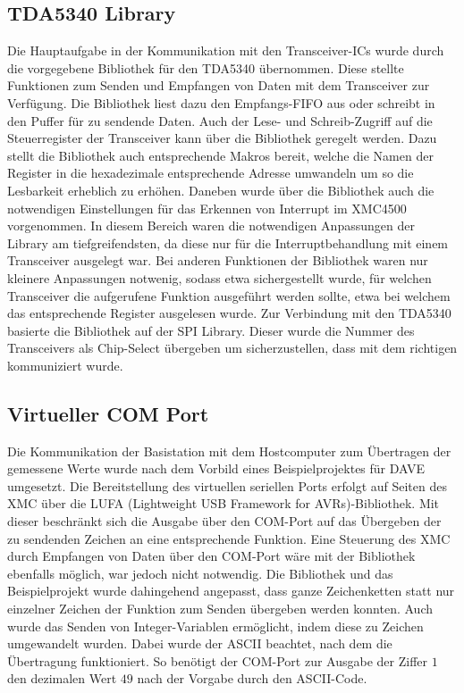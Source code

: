 \subsection{TDA5340 Library}
Die Hauptaufgabe in der Kommunikation mit den Transceiver-\acp{IC} wurde durch die vorgegebene Bibliothek für den TDA5340 übernommen. Diese stellte Funktionen zum Senden und Empfangen von Daten mit dem Transceiver zur Verfügung. Die Bibliothek liest dazu den Empfangs-\ac{FIFO} aus oder schreibt in den Puffer für zu sendende Daten. Auch der Lese- und Schreib-Zugriff auf die Steuerregister der Transceiver kann über die Bibliothek geregelt werden. Dazu stellt die Bibliothek auch entsprechende Makros bereit, welche die Namen der Register in die hexadezimale entsprechende Adresse umwandeln um so die Lesbarkeit erheblich zu erhöhen. Daneben wurde über die Bibliothek auch die notwendigen  Einstellungen für das Erkennen von Interrupt im XMC4500 vorgenommen. In diesem Bereich waren die notwendigen Anpassungen der Library am tiefgreifendsten, da diese nur für die Interruptbehandlung mit einem Transceiver ausgelegt war. Bei anderen Funktionen der Bibliothek waren nur kleinere Anpassungen notwenig, sodass etwa sichergestellt wurde, für welchen Transceiver die aufgerufene Funktion ausgeführt werden sollte, etwa bei welchem das entsprechende Register ausgelesen wurde.
Zur Verbindung mit den TDA5340 basierte die Bibliothek auf der SPI Library. Dieser wurde die Nummer des Transceivers als Chip-Select übergeben um sicherzustellen, dass mit dem richtigen kommuniziert wurde.


\subsection{Virtueller COM Port}
Die Kommunikation der Basistation mit dem Hostcomputer zum Übertragen der gemessene Werte wurde nach dem Vorbild eines Beispielprojektes für DAVE umgesetzt. Die Bereitstellung des virtuellen seriellen Ports erfolgt auf Seiten des XMC über die LUFA (Lightweight USB Framework for AVRs)-Bibliothek. Mit dieser beschränkt sich die Ausgabe über den COM-Port auf das Übergeben der zu sendenden Zeichen an eine entsprechende Funktion. Eine Steuerung des XMC durch Empfangen von Daten über den COM-Port wäre mit der Bibliothek ebenfalls möglich, war jedoch nicht notwendig.
Die Bibliothek und das Beispielprojekt wurde dahingehend angepasst, dass ganze Zeichenketten statt nur einzelner Zeichen der Funktion zum Senden übergeben werden konnten. Auch wurde das Senden von Integer-Variablen ermöglicht, indem diese zu Zeichen umgewandelt wurden. Dabei wurde der \ac{ASCII} beachtet, nach dem die Übertragung funktioniert. So benötigt der COM-Port zur Ausgabe der Ziffer $1$ den dezimalen Wert $49$ nach der Vorgabe durch den \ac{ASCII}-Code.


